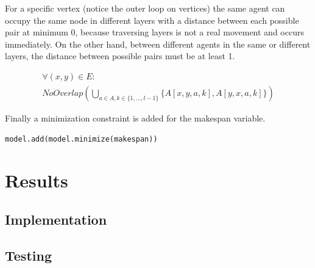 \documentclass[12pt, a4paper, hidelinks]{article}
\numberwithin{equation}{section}
\begin{document}
For a specific vertex (notice the outer loop on vertices) the same agent can occupy the same node in different layers with a distance between each possible pair at minimum 0, because traversing layers is not a real movement and occurs immediately.
On the other hand, between different agents in the same or different layers, the distance between possible pairs must be at least 1.

\begin{description}\label{eq:equation_set_2.4}
\item \begin{equation}\begin{split} \forall (x, y) \in E: \\ NoOverlap(\bigcup_{a \in A, k \in \{1,\dots,l-1\}} \{A[x,y,a,k], A[y,x,a,k]\})\end{split}\label{eq:2.18}\end{equation}
\end{description}

Finally a minimization constraint is added for the makespan variable.
\begin{lstlisting}[label={lst:minimize2}]
model.add(model.minimize(makespan))
\end{lstlisting}

\section{Results}\label{sec:results}

\subsection{Implementation}\label{subsec:implementation}

\subsection{Testing}\label{subsec:testing}
\end{document}
